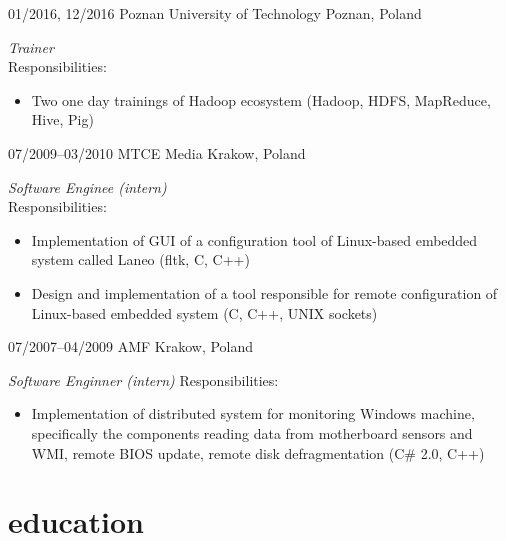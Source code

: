 \documentclass[]{gaza-cv} %
\begin{document}
\begin{entrylist}

\entry
{01/2016, 12/2016}
{Poznan University of Technology}
{Poznan, Poland}
{\emph{Trainer}\\
Responsibilities:
\begin{itemize}
\item Two one day trainings of Hadoop ecosystem (Hadoop, HDFS, MapReduce, Hive, Pig)
\end{itemize}}


\entry
{07/2009--03/2010}
{MTCE Media}
{Krakow, Poland}
{\emph{ Software Enginee (intern)}\\
Responsibilities:
\begin{itemize}
\item Implementation of GUI of a configuration tool of Linux-based embedded system called Laneo (fltk, C, C++)
\item Design and implementation of a tool responsible for remote configuration of Linux-based embedded system (C, C++, UNIX sockets)
\end{itemize}}


\entry
{07/2007--04/2009}
{AMF}
{Krakow, Poland}
{\emph{Software Enginner (intern)}
Responsibilities:
\begin{itemize}
\item Implementation of distributed system for monitoring Windows machine, specifically the components reading data from motherboard sensors and WMI, remote BIOS update, remote disk defragmentation (C\# 2.0, C++)
\end{itemize}}

\end{entrylist}


\section{education}
\end{document}
